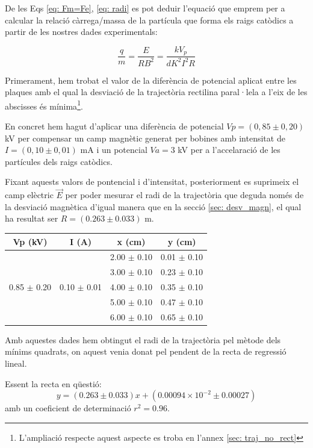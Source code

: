 \documentclass[11pt]{article}
\begin{document}
De les Eqs \eqref{eq: Fm=Fe}, \eqref{eq: radi} es pot deduir l'equació que emprem per a calcular la relació càrrega/massa de la partícula que forma els raigs catòdics a partir de les nostres dades experimentals:

\begin{equation}
    \frac{q}{m}=\frac{E}{RB^2}=\frac{kV_p}{dK^2I^2R}
\end{equation}

Primerament, hem trobat el valor de la diferència de potencial aplicat entre les plaques amb el qual la desviació de la trajectòria rectilina paral·lela a l'eix de les abscisses és mínima\footnote{L'ampliació respecte aquest aspecte es troba en l'annex \ref{sec: traj_no_rect}}. 

En concret hem hagut d'aplicar una diferència de potencial $Vp = (0,85 \pm 0,20 )$ kV per compensar un camp magnètic generat per bobines amb intensitat de $I = (0,10 \pm 0,01 )$ mA i un potencial $Va = 3$ kV per a l'accelaració de les partícules dels raigs catòdics.

Fixant aquests valors de pontencial i d'intensitat, posteriorment es suprimeix el camp elèctric $\vec{E}$ per poder mesurar el radi de la trajectòria que deguda només de la desviació magnètica d'igual manera que en la secció \ref{sec: desv_magn}, el qual ha resultat ser $R = (0.263 \pm 0.033)$ m.

\begin{table}[h!]
\centering
\begin{tabular}{|c|c|c|c|}
\hline
\textbf{Vp (kV)} & \textbf{I (A)} & \textbf{x (cm)} & \textbf{y (cm)} \\
\hline
 &  & 2.00 $\pm$ 0.10 & 0.01 $\pm$ 0.10 \\
 &  & 3.00 $\pm$ 0.10 & 0.23 $\pm$ 0.10 \\
0.85 $\pm$ 0.20 & 0.10 $\pm$ 0.01 & 4.00 $\pm$ 0.10 & 0.35 $\pm$ 0.10 \\
 &  & 5.00 $\pm$ 0.10 & 0.47 $\pm$ 0.10 \\
 &  & 6.00 $\pm$ 0.10 & 0.65 $\pm$ 0.10 \\
\hline
\end{tabular}
\end{table}

Amb aquestes dades hem obtingut el radi de la trajectòria pel mètode dels mínims quadrats, on aquest venia donat pel pendent de la recta de regressió lineal.

Essent la recta en qüestió: 
\begin{equation}
    y=(0.263 \pm 0.033)x + (0.00094\times10^{-2} \pm 0.00027)
\end{equation}  
amb un coeficient de determinació $r^2=0.96$.
\end{document}
